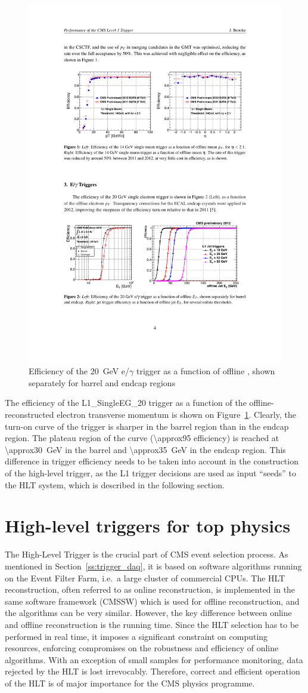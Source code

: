 \begin{figure}[!htbp]
  \centering
  \leavevmode
  \includegraphics[width=0.5\columnwidth]{L1_turnon}
  \caption{Efficiency of the \SI{20}{\GeV} e/$\gamma$ trigger as a function of offline \ET, shown separately for
  barrel and endcap regions \autocite{L1_Brooke}}
  \label{fig:L1_seed_turn_on_curve}
\end{figure}

The efficiency of the L1\_SingleEG\_20 trigger as a function of the offline-reconstructed electron transverse momentum
is shown on Figure~\ref{fig:L1_seed_turn_on_curve}. Clearly, the turn-on curve of the trigger is sharper in the barrel
region than in the endcap region. The plateau region of the curve (\SI{\approx95}{\pc} efficiency) is reached at
\SI{\approx30}{\GeV} in the barrel and \SI{\approx35}{\GeV} in the endcap region. This difference in trigger efficiency
needs to be taken into account in the construction of the high-level trigger, as the L1 trigger decisions are used as
input ``seeds'' to the HLT system, which is described in the following section.

\section{High-level triggers for top physics}
\label{s:hlt_for_top_physics}
The High-Level Trigger \autocite{HLT} is the crucial part of CMS event selection process. As mentioned in
Section~\ref{ss:trigger_daq}, it is based on software algorithms running on the Event Filter Farm, i.e.\ a large cluster
of commercial CPUs. The HLT reconstruction, often referred to as online reconstruction, is implemented in the same
software framework (CMSSW) which is used for offline reconstruction, and the algorithms can be very similar. However,
the key difference between online and offline reconstruction is the running time. Since the HLT selection has to be
performed in real time, it imposes a significant constraint on computing resources, enforcing compromises on the
robustness and efficiency of online algorithms. With an exception of small samples for performance monitoring, data
rejected by the HLT is lost irrevocably. Therefore, correct and efficient operation of the HLT is of major importance
for the CMS physics programme.

